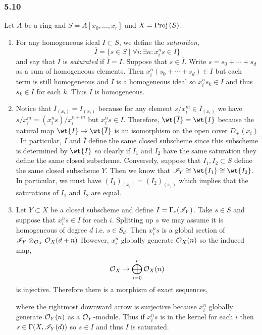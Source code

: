 \documentclass[12pt]{article}
\begin{document}
\subsubsection{5.10}

Let $A$ be a ring and $S = A[x_0, \dots, x_r]$ and $X = \mathrm{Proj}\left( S \right)$. 

\begin{enumerate}
\item For any homogeneous ideal $I \subset S$, we define the \textit{saturation},
\[ \overline{I} = \{ s \in S \mid \forall i : \exists n : x^n_i s \in I \} \]
and say that $I$ is \textit{saturated} if $\overline{I} = I$. Suppose that $s \in \overline{I}$. Write $s = s_0 + \cdots + s_d$ as a sum of homogeneous elements. Then $x_i^n(s_0 + \cdots + s_d) \in I$ but each term is still homogeneous and $I$ is a homogeneous ideal so $x_i^n s_k \in I$ and thus $s_k \in \overline{I}$ for each $k$. Thus $\overline{I}$ is homogeneous.

\item Notice that $\overline{I}_{(x_i)} = I_{(x_i)}$ because for any element $s/x_i^m \in \overline{I}_{(x_i)}$ we have $s/x_i^m = (x^n_i s)/x_i^{n+m}$ but $x^n_i s \in I$. Therefore, $\wt{\overline{I}} = \wt{I}$ because the natural map $\wt{I} \to \wt{\overline{I}}$ is an isomorphism on the open cover $D_{+}(x_i)$. In particular, $I$ and $\overline{I}$ define the same closed subscheme since this subscheme is determined by $\wt{I}$ so clearly if $I_1$ and $I_2$ have the same saturation they define the same closed subscheme. Conversely, suppose that $I_1, I_2 \subset S$ define the same closed subscheme $Y$. Then we know that $\I_Y \cong \wt{I_1} \cong \wt{I_2}$. In particular, we must have $(I_1)_{(x_i)} = (I_2)_{(x_i)}$ which implies that the saturations of $I_1$ and $I_2$ are equal.

\item Let $Y \subset X$ be a closed subscheme and define $I = \Gamma_*(\mathscr{I}_Y)$. Take $s \in S$ and suppose that $x_i^n s \in I$ for each $i$. Splitting up $s$ we may assume it is homogeneous of degree $d$ i.e. $s \in S_d$. Then $x_i^n s$ is a global section of $\mathscr{I}_Y \otimes_{\mathcal{O}_{X}} \mathcal{O}_{X}(d+n)$ 
However, $x_i^n$ globally generate $\mathcal{O}_{X}(n)$ so the induced map,
\[ \mathcal{O}_{X} \to \bigoplus_{i = 0}^r \mathcal{O}_{X}(n) \]
is injective. Therefore there is a morphism of exact sequences,
\begin{center}
\end{center}
where the rightmost downward arrow is surjective because $x_i^n$ globally generate $\mathcal{O}_{Y}(n)$ as a $\mathcal{O}_{Y}$-module.  Thus if $x^n_i s$ is in the kernel for each $i$ then $s \in \Gamma(X, \mathscr{I}_Y(d))$ so $s \in I$ and thus $I$ is saturated.


\end{enumerate}
\end{document}
